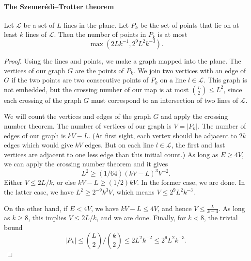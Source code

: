 \paragraph{The Szemer\'edi--Trotter theorem}
\begin{theorem}[2.1]
Let $\mathcal L$ be a set of $L$ lines in the plane. Let $P_k$ be the set of points that lie on at least $k$ lines of $\mathcal L$. Then the number of points in $P_k$ is at most
\[
\max(2Lk^{-1},2^9L^2k^{-3}).
\]
\end{theorem}
\begin{proof}
Using the lines and points, we make a graph mapped into the plane. The vertices of our graph $G$ are the points of $P_k$. We join two vertices with an edge of $G$ if the two points are two consecutive points of $P_k$ on a line $l\in\mathcal L$. This graph is not embedded, but the crossing number of our map is at most $\binom L2\leq L^2$, since each crossing of the graph $G$ must correspond to an intersection of two lines of $\mathcal L$.

We will count the vertices and edges of the graph $G$ and apply the crossing number theorem. The number of vertices of our graph is $V=|P_k|$. The number of edges of our graph is $kV-L$. (At first sight, each vertex should be adjacent to $2k$ edges which would give $kV$ edges. But on each line $l\in\mathcal L$, the first and last vertices are adjacent to one less edge than this initial count.) As long as $E\geq4V$, we can apply the crossing number theorem and it gives
\[
L^2\geq(1/64)(kV-L)^3V^{-2}.
\]
Either $V\leq2L/k$, or else $kV-L\geq(1/2)kV$. In the former case, we are done. In the latter case, we have $L^2\geq2^{-9}k^3V$, which means $V\leq2^9L^2k^{-3}$.

On the other hand, if $E<4V$, we have $kV-L\leq4V$, and hence $V\leq\frac{L}{k-4}$. As long as $k\geq8$, this implies $V\leq2L/k$, and we are done. Finally, for $k<8$, the trivial bound
\[
|P_k|\leq\binom L2/\binom k2\leq2L^2k^{-2}\leq2^9L^2k^{-3}.
\]
\end{proof}
